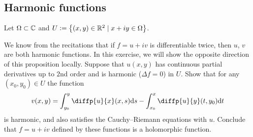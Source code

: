 \documentclass[11pt,a4paper]{article}
\begin{document}
\subsection{Harmonic functions}
Let $\Omega \subset \mathbb{C}$ and 
$U := \left\{(x,y) \in \mathbb{R}^2 \mid x + i y \in \Omega\right\}$.
\begin{exercise}
  We know from the recitations that if $f = u + i v$ is differentiable twice,
  then $u$, $v$ are both harmonic functions.
  In this exercise, we will show the opposite direction of this proposition
  locally.
  Suppose that $u(x,y)$ has continuous partial derivatives up to $2$nd order
  and is harmonic ($\Delta f = 0$) in $U$.
  Show that for any $(x_0, y_0) \in U$ the function
  \[
    v(x,y) =
    \int_{y_0}^{y} \diffp{u}{x}(x,s) \ds -
    \int_{x_0}^{x} \diffp{u}{y}(t,y_0) \dt
  \]
  is harmonic, and also satisfies the Cauchy--Riemann equations with $u$.
  Conclude that $f = u + i v$ defined by these functions is a holomorphic
  function.
\end{exercise}
\end{document}
